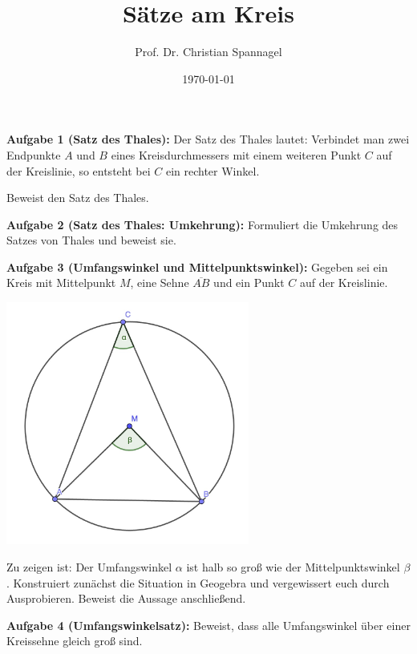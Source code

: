 \documentclass{../cssheet}
\title{Sätze am Kreis}
\author{Prof. Dr. Christian Spannagel}
\date{\today}
\begin{document}
\printtitle

\textbf{Aufgabe 1 (Satz des Thales):}  Der Satz des Thales lautet: Verbindet man zwei Endpunkte $A$ und $B$ eines Kreisdurchmessers mit einem weiteren Punkt $C$ auf der Kreislinie, so entsteht bei $C$ ein rechter Winkel.

Beweist den Satz des Thales.

\textbf{Aufgabe 2 (Satz des Thales: Umkehrung):} Formuliert die Umkehrung des Satzes von Thales und beweist sie.

\textbf{Aufgabe 3 (Umfangswinkel und Mittelpunktswinkel):} Gegeben sei ein Kreis mit Mittelpunkt $M$, eine Sehne $\overline{AB}$ und ein Punkt $C$ auf der Kreislinie. 
\begin{center}
\includegraphics[width=8cm]{umfangswinkel.png}
\end{center}
Zu zeigen ist: Der Umfangswinkel $\alpha$ ist halb so groß wie der Mittelpunktswinkel $\beta$. Konstruiert zunächst die Situation in Geogebra und vergewissert euch durch Ausprobieren. Beweist die Aussage anschließend.

\textbf{Aufgabe 4 (Umfangswinkelsatz):}  Beweist, dass alle Umfangswinkel über einer Kreissehne gleich groß sind.

\vspace*{10mm}
\printlicense

\printsocials


\end{document}
